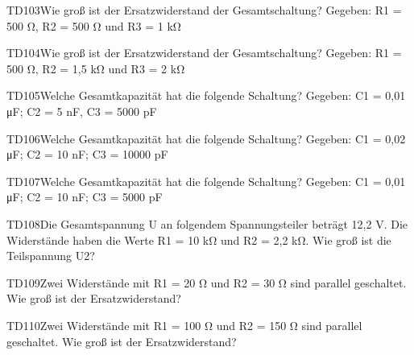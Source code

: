 \begin{question}{TD103}{Wie groß ist der Ersatzwiderstand der Gesamtschaltung? Gegeben: R1 = 500 Ω,  R2 = 500 Ω und R3 = 1 kΩ}
\end{question}

\begin{question}{TD104}{Wie groß ist der Ersatzwiderstand der Gesamtschaltung? Gegeben: R1 = 500 Ω,  R2 = 1,5 kΩ und R3 = 2 kΩ}
\end{question}

\begin{question}{TD105}{Welche Gesamtkapazität hat die folgende Schaltung? Gegeben: C1 = 0,01 μF;  C2 = 5 nF,  C3 = 5000 pF}
\end{question}

\begin{question}{TD106}{Welche Gesamtkapazität hat die folgende Schaltung? Gegeben: C1 = 0,02 μF; C2 = 10 nF; C3 = 10000 pF}
\end{question}

\begin{question}{TD107}{Welche Gesamtkapazität hat die folgende Schaltung? Gegeben: C1 = 0,01 μF; C2 = 10 nF; C3 = 5000 pF}
\end{question}

\begin{question}{TD108}{Die Gesamtspannung U an folgendem Spannungsteiler beträgt 12,2 V. Die Widerstände haben die Werte R1 = 10 kΩ und R2 = 2,2 kΩ. Wie groß ist die Teilspannung U2?}
\end{question}

\begin{question}{TD109}{Zwei Widerstände mit R1 = 20 Ω und R2 = 30 Ω sind parallel geschaltet. Wie groß ist der Ersatzwiderstand?}
\end{question}

\begin{question}{TD110}{Zwei Widerstände mit R1 = 100 Ω und R2 = 150 Ω sind parallel geschaltet. Wie groß ist der Ersatzwiderstand?}
\end{question}

